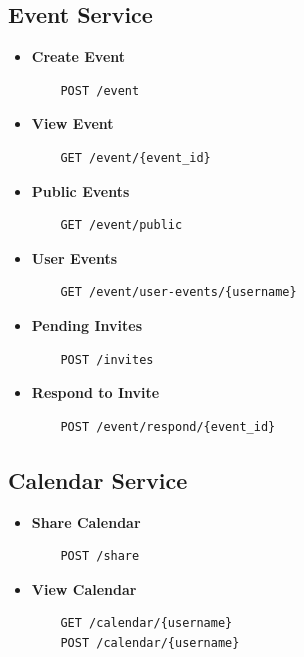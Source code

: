\documentclass{article}
\begin{document}
\subsection{Event Service}
\begin{itemize}
    \item \textbf{Create Event}
    \begin{verbatim}
    POST /event
    \end{verbatim}
    \item \textbf{View Event}
    \begin{verbatim}
    GET /event/{event_id}
    \end{verbatim}
    \item \textbf{Public Events}
    \begin{verbatim}
    GET /event/public
    \end{verbatim}
    \item \textbf{User Events}
    \begin{verbatim}
    GET /event/user-events/{username}
    \end{verbatim}
    \item \textbf{Pending Invites}
    \begin{verbatim}
    POST /invites
    \end{verbatim}
    \item \textbf{Respond to Invite}
    \begin{verbatim}
    POST /event/respond/{event_id}
    \end{verbatim}
\end{itemize}

\subsection{Calendar Service}
\begin{itemize}
    \item \textbf{Share Calendar}
    \begin{verbatim}
    POST /share
    \end{verbatim}
    \item \textbf{View Calendar}
    \begin{verbatim}
    GET /calendar/{username}
    POST /calendar/{username}
    \end{verbatim}
\end{itemize}
\end{document}
